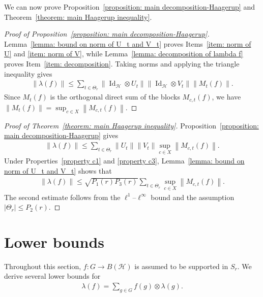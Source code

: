 \documentclass[12pt,reqno]{amsart}
\newcommand{\norm}[1]{\left\|#1\right\|}
\newcommand{\Id}{\operatorname{Id}}
\newcommand{\Hil}{\mathcal{H}}
\numberwithin{equation}{section}
\begin{document}
We can now prove Proposition~\ref{proposition: main decomposition-Haagerup} and Theorem~\ref{theorem: main Haagerup inequality}.
\begin{proof}[Proof of Proposition~\ref{proposition: main decomposition-Haagerup}]
    Lemma~\ref{lemma: bound on norm of U_t and V_t} proves Items~\ref{item: norm of U} and \ref{item: norm of V}, while Lemma~\ref{lemma: decomposition of lambda f} proves Item~\ref{item: decomposition}. Taking norms and applying the triangle inequality gives
    \begin{align*}
        \norm{\lambda(f)}\le \sum_{t\in \Theta_r} \norm{\Id_\Hil\otimes U_t}\norm{\Id_\Hil\otimes V_t}\norm{M_t(f)}.
    \end{align*}
    Since $M_t(f)$ is the orthogonal direct sum of the blocks $M_{c,t}(f)$, we have $\norm{M_t(f)}=\sup_{c\in X}\norm{M_{c,t}(f)}$.
\end{proof}
\begin{proof}[Proof of Theorem~\ref{theorem: main Haagerup inequality}]
    Proposition~\ref{proposition: main decomposition-Haagerup} gives
    \begin{align*}
         \norm{\lambda(f)}\le \sum_{t\in \Theta_r} \norm{U_t}\norm{V_t}\sup_{c\in X}\norm{M_{c,t}(f)}.
    \end{align*}
    Under Properties~\ref{property c1} and \ref{property c3}, Lemma~\ref{lemma: bound on norm of U_t and V_t} shows that
    \begin{align*}
        \norm{\lambda(f)}\le \sqrt{P_1(r)P_3(r)}\sum_{t\in \Theta_r}\sup_{c\in X}\norm{M_{c,t}(f)}.
    \end{align*}
    The second estimate follows from the $\ell^1$--$\ell^\infty$ bound and the assumption $|\Theta_r|\le P_2(r)$.
\end{proof}


\section{Lower bounds}\label{section: lower bounds}
Throughout this section, $f: G\to B(\Hil)$ is assumed to be supported in $S_r$. We derive several lower bounds for
\begin{align*}
    \lambda(f)=\sum_{g\in G}f(g)\otimes \lambda(g).
\end{align*}
\end{document}
